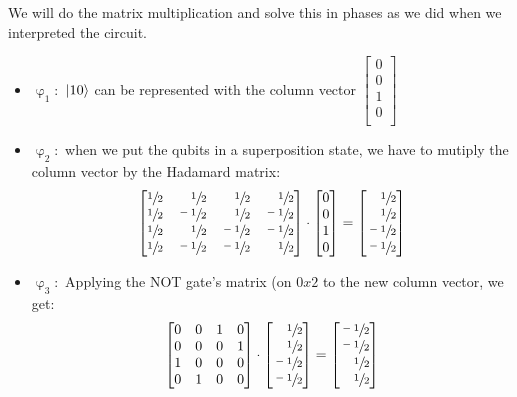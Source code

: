 \documentclass[12pt]{article}
\theoremstyle{definition}
\begin{document}
We will do the matrix multiplication and solve this in phases as we did when we interpreted the circuit. 

\begin{itemize}

\item $\upvarphi_1:$ $\ket{10}$ can be represented with the column vector $\begin{bmatrix}
0\\
0\\
1\\
0\\
\end{bmatrix}$ 
\item $\upvarphi_2:$ when we put the qubits in a superposition state, we have to mutiply the column vector by the Hadamard matrix:
\[\begin{bmatrix}
\sfrac{1}{2}& \quad\sfrac{1}{2}&\quad\sfrac{1}{2}& \quad\sfrac{1}{2}\\
\sfrac{1}{2}&\sfrac{-1}{2}&\quad \sfrac{1}{2}&\sfrac{-1}{2}\\
\sfrac{1}{2}&\quad\sfrac{1}{2}&\sfrac{-1}{2}&\sfrac{-1}{2}\\
\sfrac{1}{2}&\sfrac{-1}{2}&\sfrac{-1}{2}&\quad\sfrac{1}{2}\\
\end{bmatrix}
\cdot
\begin{bmatrix}
0\\
0\\
1\\
0\\
\end{bmatrix}
=
\begin{bmatrix}
\quad\sfrac{1}{2}\\
\quad\sfrac{1}{2}\\
\sfrac{-1}{2}\\
\sfrac{-1}{2}\\
\end{bmatrix}\]
\item $\upvarphi_3:$ Applying the NOT gate's matrix (on $0x2$ to the new column vector, we get: 
\[
\begin{bmatrix}
0&0&1&0\\
0&0&0&1\\
1&0&0&0\\
0&1&0&0\\
\end{bmatrix}
\cdot
\begin{bmatrix}
\quad\sfrac{1}{2}\\
\quad\sfrac{1}{2}\\
\sfrac{-1}{2}\\
\sfrac{-1}{2}\\
\end{bmatrix}
=
\begin{bmatrix}
\sfrac{-1}{2}\\
\sfrac{-1}{2}\\
\quad\sfrac{1}{2}\\
\quad\sfrac{1}{2}\\
\end{bmatrix}
\]


\end{itemize}
\end{document}
